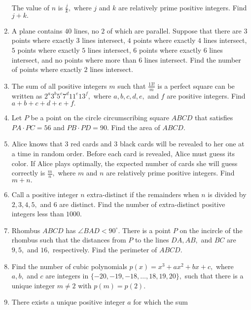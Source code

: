 \documentclass{article}
\begin{document}
\begin{enumerate}[label=\arabic*., itemsep=0.5em]
 The value of \(n\) is \(\frac{j}{k},\) where \(j\) and \(k\) are relatively prime positive integers. Find \(j+k.\)\par \vspace{0.5em}\item A plane contains \(40\) lines, no \(2\) of which are parallel. Suppose that there are \(3\) points where exactly \(3\) lines intersect, \(4\) points where exactly \(4\) lines intersect, \(5\) points where exactly \(5\) lines intersect, \(6\) points where exactly \(6\) lines intersect, and no points where more than \(6\) lines intersect. Find the number of points where exactly \(2\) lines intersect.\par \vspace{0.5em}\item The sum of all positive integers \(m\) such that \(\frac{13!}{m}\) is a perfect square can be written as \(2^a3^b5^c7^d11^e13^f,\) where \(a,b,c,d,e,\) and \(f\) are positive integers. Find \(a+b+c+d+e+f.\)\par \vspace{0.5em}\item Let \(P\) be a point on the circle circumscribing square \(ABCD\) that satisfies \(PA \cdot PC = 56\) and \(PB \cdot PD = 90.\) Find the area of \(ABCD.\)\par \vspace{0.5em}\item Alice knows that \(3\) red cards and \(3\) black cards will be revealed to her one at a time in random order. Before each card is revealed, Alice must guess its color. If Alice plays optimally, the expected number of cards she will guess correctly is \(\frac{m}{n},\) where \(m\) and \(n\) are relatively prime positive integers. Find \(m+n.\)\par \vspace{0.5em}\item Call a positive integer \(n\) extra-distinct if the remainders when \(n\) is divided by \(2, 3, 4, 5,\) and \(6\) are distinct. Find the number of extra-distinct positive integers less than \(1000\).\par \vspace{0.5em}\item Rhombus \(ABCD\) has \(\angle BAD < 90^\circ.\) There is a point \(P\) on the incircle of the rhombus such that the distances from \(P\) to the lines \(DA,AB,\) and \(BC\) are \(9,5,\) and \(16,\) respectively. Find the perimeter of \(ABCD.\)\par \vspace{0.5em}\item Find the number of cubic polynomials \(p(x) = x^3 + ax^2 + bx + c,\) where \(a, b,\) and \(c\) are integers in \(\{-20,-19,-18,\ldots,18,19,20\},\) such that there is a unique integer \(m \not= 2\) with \(p(m) = p(2).\)\par \vspace{0.5em}\item There exists a unique positive integer \(a\) for which the sum 

\end{enumerate}
\end{document}
